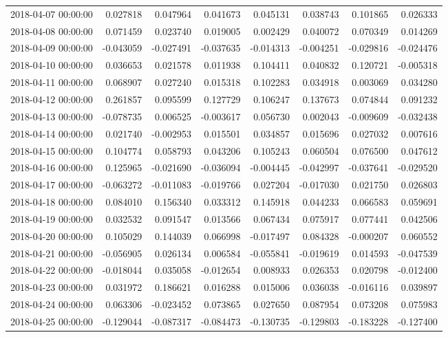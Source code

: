 \begin{tabular}{lrrrrrrr}
2018-04-07 00:00:00 & 0.027818 & 0.047964 & 0.041673 & 0.045131 & 0.038743 & 0.101865 & 0.026333 \\
2018-04-08 00:00:00 & 0.071459 & 0.023740 & 0.019005 & 0.002429 & 0.040072 & 0.070349 & 0.014269 \\
2018-04-09 00:00:00 & -0.043059 & -0.027491 & -0.037635 & -0.014313 & -0.004251 & -0.029816 & -0.024476 \\
2018-04-10 00:00:00 & 0.036653 & 0.021578 & 0.011938 & 0.104411 & 0.040832 & 0.120721 & -0.005318 \\
2018-04-11 00:00:00 & 0.068907 & 0.027240 & 0.015318 & 0.102283 & 0.034918 & 0.003069 & 0.034280 \\
2018-04-12 00:00:00 & 0.261857 & 0.095599 & 0.127729 & 0.106247 & 0.137673 & 0.074844 & 0.091232 \\
2018-04-13 00:00:00 & -0.078735 & 0.006525 & -0.003617 & 0.056730 & 0.002043 & -0.009609 & -0.032438 \\
2018-04-14 00:00:00 & 0.021740 & -0.002953 & 0.015501 & 0.034857 & 0.015696 & 0.027032 & 0.007616 \\
2018-04-15 00:00:00 & 0.104774 & 0.058793 & 0.043206 & 0.105243 & 0.060504 & 0.076500 & 0.047612 \\
2018-04-16 00:00:00 & 0.125965 & -0.021690 & -0.036094 & -0.004445 & -0.042997 & -0.037641 & -0.029520 \\
2018-04-17 00:00:00 & -0.063272 & -0.011083 & -0.019766 & 0.027204 & -0.017030 & 0.021750 & 0.026803 \\
2018-04-18 00:00:00 & 0.084010 & 0.156340 & 0.033312 & 0.145918 & 0.044233 & 0.066583 & 0.059691 \\
2018-04-19 00:00:00 & 0.032532 & 0.091547 & 0.013566 & 0.067434 & 0.075917 & 0.077441 & 0.042506 \\
2018-04-20 00:00:00 & 0.105029 & 0.144039 & 0.066998 & -0.017497 & 0.084328 & -0.000207 & 0.060552 \\
2018-04-21 00:00:00 & -0.056905 & 0.026134 & 0.006584 & -0.055841 & -0.019619 & 0.014593 & -0.047539 \\
2018-04-22 00:00:00 & -0.018044 & 0.035058 & -0.012654 & 0.008933 & 0.026353 & 0.020798 & -0.012400 \\
2018-04-23 00:00:00 & 0.031972 & 0.186621 & 0.016288 & 0.015006 & 0.036038 & -0.016116 & 0.039897 \\
2018-04-24 00:00:00 & 0.063306 & -0.023452 & 0.073865 & 0.027650 & 0.087954 & 0.073208 & 0.075983 \\
2018-04-25 00:00:00 & -0.129044 & -0.087317 & -0.084473 & -0.130735 & -0.129803 & -0.183228 & -0.127400 \\

\end{tabular}
